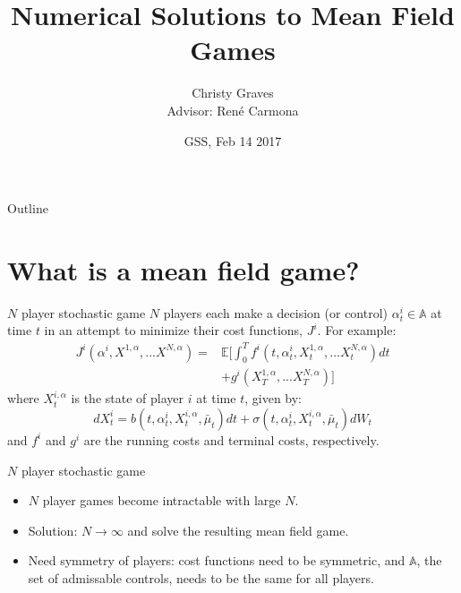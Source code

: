 \documentclass{beamer}
\title{Numerical Solutions to Mean Field Games}
\author[Christy Graves]{Christy Graves\\{\small Advisor: Ren\'{e} Carmona}}
\institute[Princeton University] %
{
	Program in Applied and Computational Mathematics\\
	Princeton University
}
\date{GSS, Feb 14 2017}
\begin{document}
	
	\begin{frame}
		\titlepage
	\end{frame}
	
	\begin{frame}{Outline}
		\tableofcontents
	\end{frame}
	
	\section{What is a mean field game?}
	
	\begin{frame}{$N$ player stochastic game}
		$N$ players each make a decision (or control) $\alpha_t^i \in \mathbb{A}$ at time $t$ in an attempt to minimize their cost functions, $J^i$. For example:
		\begin{equation}
			\begin{split}
				J^i(\alpha^i,X^{1,\alpha},...X^{N,\alpha})=&\mathbb{E}\Bigg[\int_{0}^{T}f^i(t,\alpha_t^i,X_t^{1,\alpha},...X_t^{N,\alpha})dt \\
				&+g^i(X_T^{1,\alpha},...X_T^{N,\alpha}) \Bigg]
			\end{split}
		\end{equation}
		where $X_t^{i,\alpha}$ is the state of player $i$ at time $t$, given by:
		\begin{equation}
			dX_t^i=b(t,\alpha_t^i,X_t^{i,\alpha},\bar{\mu}_t)dt+\sigma(t,\alpha_t^i,X_t^{i,\alpha},\bar{\mu}_t)dW_t
		\end{equation}
		and $f^i$ and $g^i$ are the running costs and terminal costs, respectively.
	\end{frame}
	
	\begin{frame}{$N$ player stochastic game}
		\begin{itemize}
			\item {
				$N$ player games become intractable with large $N$.
			}
			\item {
				Solution: $N \rightarrow \infty$ and solve the resulting mean field game.
			}
			\item {
				Need symmetry of players: cost functions need to be symmetric, and $\mathbb{A}$, the set of admissable controls, needs to be the same for all players.
			}
		\end{itemize}
	\end{frame}
	
\end{document}
